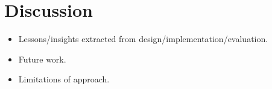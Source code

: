 \section*{Discussion}

\begin{itemize}
\item Lessons/insights extracted from design/implementation/evaluation.
\item Future work.
\item Limitations of approach.
\end{itemize}
